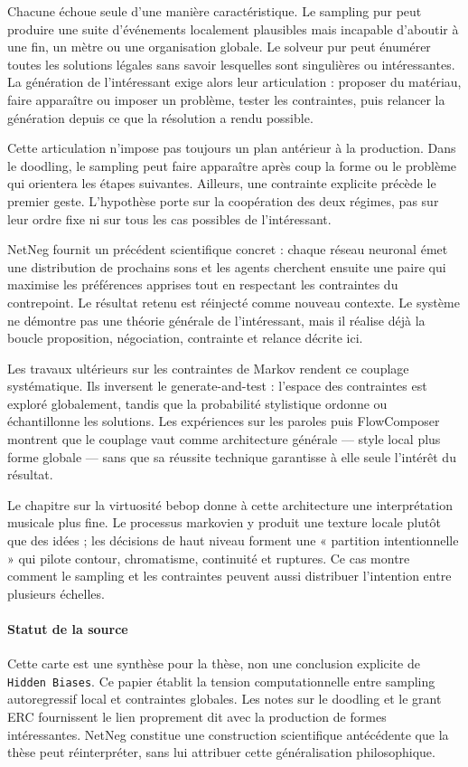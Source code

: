 \documentclass[10pt,a4paper]{article}
\begin{document}
Chacune échoue seule d'une manière caractéristique. Le sampling pur peut produire une suite d'événements localement plausibles mais incapable d'aboutir à une fin, un mètre ou une organisation globale. Le solveur pur peut énumérer toutes les solutions légales sans savoir lesquelles sont singulières ou intéressantes. La génération de l'intéressant exige alors leur articulation : proposer du matériau, faire apparaître ou imposer un problème, tester les contraintes, puis relancer la génération depuis ce que la résolution a rendu possible.

Cette articulation n'impose pas toujours un plan antérieur à la production. Dans le doodling, le sampling peut faire apparaître après coup la forme ou le problème qui orientera les étapes suivantes. Ailleurs, une contrainte explicite précède le premier geste. L'hypothèse porte sur la coopération des deux régimes, pas sur leur ordre fixe ni sur tous les cas possibles de l'intéressant.

NetNeg fournit un précédent scientifique concret : chaque réseau neuronal émet une distribution de prochains sons et les agents cherchent ensuite une paire qui maximise les préférences apprises tout en respectant les contraintes du contrepoint. Le résultat retenu est réinjecté comme nouveau contexte. Le système ne démontre pas une théorie générale de l'intéressant, mais il réalise déjà la boucle proposition, négociation, contrainte et relance décrite ici.

Les travaux ultérieurs sur les contraintes de Markov rendent ce couplage systématique. Ils inversent le generate-and-test : l'espace des contraintes est exploré globalement, tandis que la probabilité stylistique ordonne ou échantillonne les solutions. Les expériences sur les paroles puis FlowComposer montrent que le couplage vaut comme architecture générale — style local plus forme globale — sans que sa réussite technique garantisse à elle seule l'intérêt du résultat.

Le chapitre sur la virtuosité bebop donne à cette architecture une interprétation musicale plus fine. Le processus markovien y produit une texture locale plutôt que des idées ; les décisions de haut niveau forment une « partition intentionnelle » qui pilote contour, chromatisme, continuité et ruptures. Ce cas montre comment le sampling et les contraintes peuvent aussi distribuer l'intention entre plusieurs échelles.

\paragraph{Statut de la source}
Cette carte est une synthèse pour la thèse, non une conclusion explicite de \texttt{Hidden Biases}. Ce papier établit la tension computationnelle entre sampling autoregressif local et contraintes globales. Les notes sur le doodling et le grant ERC fournissent le lien proprement dit avec la production de formes intéressantes. NetNeg constitue une construction scientifique antécédente que la thèse peut réinterpréter, sans lui attribuer cette généralisation philosophique.
\end{document}

